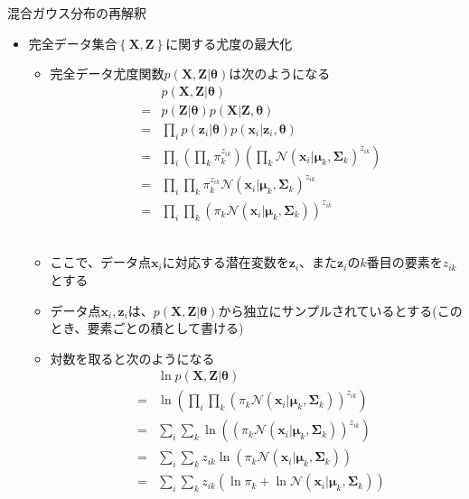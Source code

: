\documentclass[dvipdfmx,notheorems,t]{beamer}
\begin{document}
\begin{frame}{混合ガウス分布の再解釈}

\begin{itemize}
	\item 完全データ集合$\left\{ \bm{X}, \bm{Z} \right\}$に関する尤度の最大化
	\begin{itemize}
		\item 完全データ尤度関数$p(\bm{X}, \bm{Z} | \bm{\theta})$は次のようになる
		\begin{eqnarray}
			&& p(\bm{X}, \bm{Z} | \bm{\theta}) \nonumber \\
			&=& p(\bm{Z} | \bm{\theta}) p(\bm{X} | \bm{Z}, \bm{\theta}) \nonumber \\
			&=& \prod_i p(\bm{z}_i | \bm{\theta}) p(\bm{x}_i | \bm{z}_i, \bm{\theta}) \nonumber \\
			&=& \prod_i \left( \prod_k \pi_k^{z_{ik}} \right) \left( \prod_k \mathcal{N}(\bm{x}_i | \bm{\mu}_k, \bm{\Sigma}_k)^{z_{ik}} \right) \nonumber \\
			&=& \prod_i \prod_k \pi_k^{z_{ik}} \mathcal{N}(\bm{x}_i | \bm{\mu}_k, \bm{\Sigma}_k)^{z_{ik}} \nonumber \\
			&=& \prod_i \prod_k \left( \pi_k \mathcal{N}(\bm{x}_i | \bm{\mu}_k, \bm{\Sigma}_k) \right)^{z_{ik}}
		\end{eqnarray} \
		
		\item ここで、データ点$\bm{x}_i$に対応する潜在変数を$\bm{z}_i$、また$\bm{z}_i$の$k$番目の要素を$z_{ik}$とする
		\newline
		
		\item データ点$\bm{x}_i, \bm{z}_i$は、$p(\bm{X}, \bm{Z} | \bm{\theta})$から独立にサンプルされているとする(このとき、要素ごとの積として書ける)
		\newline
		
		\item 対数を取ると次のようになる
		\begin{eqnarray}
			&& \ln p(\bm{X}, \bm{Z} | \bm{\theta}) \nonumber \\
			&=& \ln \left( \prod_i \prod_k \left( \pi_k \mathcal{N}(\bm{x}_i | \bm{\mu}_k, \bm{\Sigma}_k) \right)^{z_{ik}} \right) \nonumber \\
			&=& \sum_i \sum_k \ln \left( \left( \pi_k \mathcal{N}(\bm{x}_i | \bm{\mu}_k, \bm{\Sigma}_k) \right)^{z_{ik}} \right) \nonumber \\
			&=& \sum_i \sum_k z_{ik} \ln \left( \pi_k \mathcal{N}(\bm{x}_i | \bm{\mu}_k, \bm{\Sigma}_k) \right) \nonumber \\
			&=& \sum_i \sum_k z_{ik} \left( \ln \pi_k + \ln \mathcal{N}(\bm{x}_i | \bm{\mu}_k, \bm{\Sigma}_k) \right)
		\end{eqnarray}
		

\end{itemize}
\end{itemize}
\end{frame}
\end{document}
